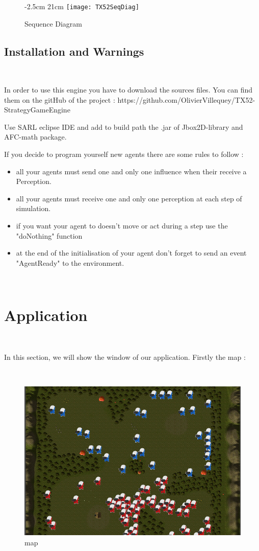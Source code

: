 \documentclass[a4paper,10pt]{book}
\begin{document}
\begin{figure}[!ht]
  -2.5cm 21cm
 \centering
 \texttt{[image: TX52SeqDiag]}
 \caption{Sequence Diagram}
\end{figure}

\newpage
\section {Installation and Warnings}

~

In order to use this engine you have to download the sources files. You can find them on the gitHub of the project : https://github.com/OlivierVillequey/TX52-StrategyGameEngine

Use SARL eclipse IDE and add to build path the .jar of Jbox2D-library and AFC-math package.

If you decide to program yourself new agents there are some rules to follow : 
\begin{itemize}
\item all your agents must send one and only one influence when their receive a Perception.
\item all your agents must receive one and only one perception at each step of simulation.
\item if you want your agent to doesn't move or act during a step use the "doNothing" function
\item at the end of the initialisation of your agent don't forget to send an event "AgentReady" to the environment.
\end{itemize}

~
\newpage
\chapter {Application}

~

In this section, we will show the window of our application. Firstly the map :

~

\begin{figure}[h]
 \centering
 \includegraphics[scale=0.5]{GUI2}
 \caption{map}
\end{figure}
\end{document}
